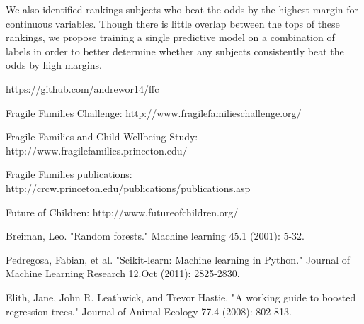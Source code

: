 \documentclass{article} %
\begin{document}
We also identified rankings subjects who beat the odds by the highest margin for continuous variables. Though there is little overlap between the tops of these rankings, we propose training a single predictive model on a combination of labels in order to better determine whether any subjects consistently beat the odds by high margins.

\begin{thebibliography}{}

https://github.com/andrewor14/ffc

Fragile Families Challenge: http://www.fragilefamilieschallenge.org/

Fragile Families and Child Wellbeing Study: http://www.fragilefamilies.princeton.edu/

Fragile Families publications: http://crcw.princeton.edu/publications/publications.asp

Future of Children: http://www.futureofchildren.org/

Breiman, Leo. "Random forests." Machine learning 45.1 (2001): 5-32.

Pedregosa, Fabian, et al. "Scikit-learn: Machine learning in Python." Journal of Machine Learning Research 12.Oct (2011): 2825-2830.

Elith, Jane, John R. Leathwick, and Trevor Hastie. "A working guide to boosted regression trees." Journal of Animal Ecology 77.4 (2008): 802-813.
 
\end{thebibliography}
\end{document}
